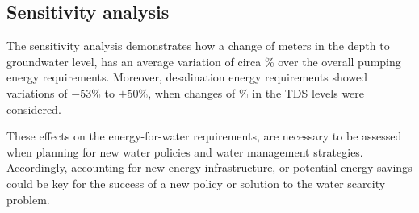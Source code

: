 \subsection{Sensitivity analysis}
The sensitivity analysis demonstrates how a change of  meters in the depth to groundwater level, has an average variation of circa \% over the overall pumping energy requirements. Moreover, desalination energy requirements showed variations of $-$53\% to $+$50\%, when changes of \% in the TDS levels were considered.

These effects on the energy-for-water requirements, are necessary to be assessed when planning for new water policies and water management strategies. Accordingly, accounting for new energy infrastructure, or potential energy savings could be key for the success of a new policy or solution to the water scarcity problem.